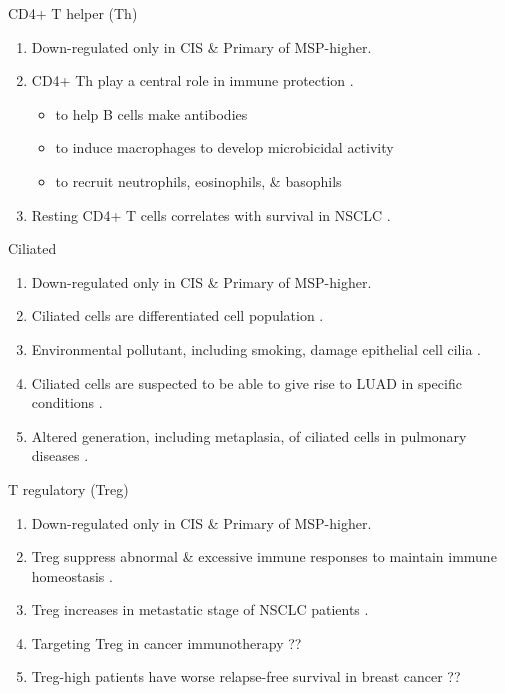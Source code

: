 \documentclass{beamer}
\begin{document}
\begin{frame}[allowframebreaks]
        \begin{block}{CD4+ T helper (Th)}
            \begin{enumerate}
                \item Down-regulated only in CIS \& Primary of MSP-higher.
                \item CD4+ Th play a central role in immune protection \cite{CD4+Tcell-1}.
                    \begin{itemize}
                        \item to help B cells make antibodies
                        \item to induce macrophages to develop microbicidal activity
                        \item to recruit neutrophils, eosinophils, \& basophils
                    \end{itemize}
                \item Resting CD4+ T cells correlates with survival in NSCLC \cite{CD4+Tcell-2}.
            \end{enumerate}
        \end{block}

        \begin{block}{Ciliated}
            \begin{enumerate}
                \item Down-regulated only in CIS \& Primary of MSP-higher.
                \item Ciliated cells are differentiated cell population \cite{ciliated-1}.
                \item Environmental pollutant, including smoking, damage epithelial cell cilia \cite{ciliated-2}.
                \item Ciliated cells are suspected to be able to give rise to LUAD in specific conditions \cite{ciliated-3}.
                \item Altered generation, including metaplasia, of ciliated cells in pulmonary diseases \cite{ciliated-4}.
            \end{enumerate}
        \end{block}

        \begin{block}{T regulatory (Treg)}
            \begin{enumerate}
                \item Down-regulated only in CIS \& Primary of MSP-higher.
                \item Treg suppress abnormal \& excessive immune responses to maintain immune homeostasis \cite{Treg-1}.
                \item Treg increases in metastatic stage of NSCLC patients \cite{Treg-2}.
                \item Targeting Treg in cancer immunotherapy \cite{Treg-3} ??
                \item Treg-high patients have worse relapse-free survival in breast cancer \cite{Treg-4} ??
            \end{enumerate}
        \end{block}


\end{frame}
\end{document}
